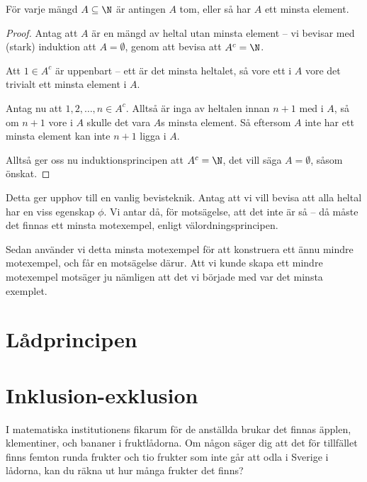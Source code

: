 \documentclass[nobib]{tufte-handout}
\begin{document}
\begin{theorem}[Välordningsprincipen]
  För varje mängd $A \subseteq \N$ är antingen $A$ tom, eller så har $A$ ett minsta element.

  \begin{proof}
    Antag att $A$ är en mängd av heltal utan minsta element -- vi bevisar med (stark) induktion att $A = \emptyset$, genom att bevisa att $A^c = \N$.

    Att $1 \in A^c$ är uppenbart -- ett är det minsta heltalet, så vore ett i $A$ vore det trivialt ett minsta element i $A$.

    Antag nu att $1, 2, \ldots, n \in A^c$. Alltså är inga av heltalen innan $n+1$ med i $A$, så om $n+1$ vore i $A$ skulle det vara $A$s minsta element. Så eftersom $A$ inte har ett minsta element kan inte $n+1$ ligga i $A$.

    Alltså ger oss nu induktionsprincipen att $A^c = \N$, det vill säga $A = \emptyset$, såsom önskat.
  \end{proof}
\end{theorem}

\begin{remark}
  Detta ger upphov till en vanlig bevisteknik. Antag att vi vill bevisa att alla heltal har en viss egenskap $\phi$. Vi antar då, för motsägelse, att det inte är så -- då måste det finnas ett minsta motexempel, enligt välordningsprincipen. 
  
  Sedan använder vi detta minsta motexempel för att konstruera ett ännu mindre motexempel, och får en motsägelse därur. Att vi kunde skapa ett mindre motexempel motsäger ju nämligen att det vi började med var det minsta exemplet.
\end{remark}

\section{Lådprincipen}

\section{Inklusion-exklusion}

I matematiska institutionens fikarum för de anställda brukar det finnas äpplen, klementiner, och bananer i fruktlådorna. Om någon säger dig att det för tillfället finns femton runda frukter och tio frukter som inte går att odla i Sverige i lådorna, kan du räkna ut hur många frukter det finns?
\end{document}
